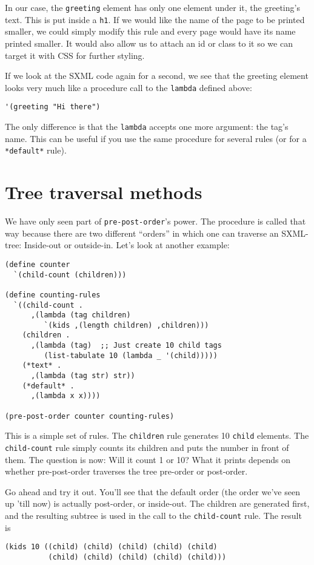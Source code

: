\documentclass{article}
\begin{document}
In our case, the \verb|greeting| element has only one element under
it, the greeting's text.  This is put inside a \verb|h1|.  If we would
like the name of the page to be printed smaller, we could simply
modify this rule and every page would have its name printed smaller.
It would also allow us to attach an id or class to it so we can target
it with CSS for further styling.

If we look at the SXML code again for a second, we see that the
greeting element looks very much like a procedure call to the
\verb|lambda| defined above:

\begin{verbatim}
'(greeting "Hi there")
\end{verbatim}

The only difference is that the \verb|lambda| accepts one more
argument: the tag's name.  This can be useful if you use the same
procedure for several rules (or for a \verb|*default*| rule).


\section{Tree traversal methods}

We have only seen part of \verb|pre-post-order|'s power.  The procedure
is called that way because there are two different ``orders'' in which
one can traverse an SXML-tree: Inside-out or outside-in.  Let's look
at another example:

\begin{verbatim}
(define counter
  `(child-count (children)))

(define counting-rules
  `((child-count .
      ,(lambda (tag children)
         `(kids ,(length children) ,children)))
    (children .
      ,(lambda (tag)  ;; Just create 10 child tags
         (list-tabulate 10 (lambda _ '(child)))))
    (*text* .
      ,(lambda (tag str) str))
    (*default* .
      ,(lambda x x))))

(pre-post-order counter counting-rules)
\end{verbatim}

This is a simple set of rules.  The \verb|children| rule generates 10
\verb|child| elements.  The \verb|child-count| rule simply counts its
children and puts the number in front of them.  The question is now:
Will it count 1 or 10?  What it prints depends on whether
pre-post-order traverses the tree pre-order or post-order.

Go ahead and try it out.  You'll see that the default order (the order
we've seen up 'till now) is actually post-order, or inside-out.  The
children are generated first, and the resulting subtree is used in the
call to the \verb|child-count| rule.  The result is
\begin{verbatim}
(kids 10 ((child) (child) (child) (child) (child)
          (child) (child) (child) (child) (child)))
\end{verbatim}
\end{document}
